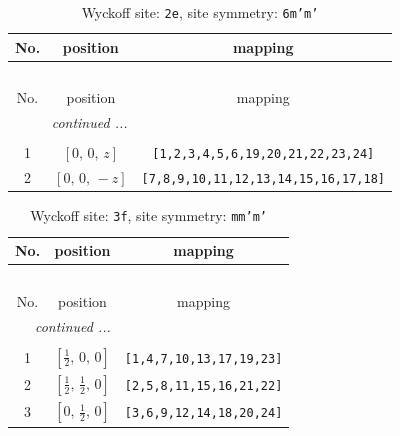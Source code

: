 \documentclass[fleqn,8pt]{jsarticle}
\begin{document}
\begin{longtable}{ccc}
\caption{Wyckoff site: {\tt 2e}, site symmetry: {\tt 6m'm'}}
 \\
 \hline \hline
No. & position & mapping \\ \hline \endfirsthead

\multicolumn{2}{l}{\tablename\ \thetable{}} \\
 \hline \hline
No. & position & mapping \\ \hline \endhead

 \hline \hline
\multicolumn{2}{r}{\footnotesize\it continued ...} \\ \endfoot

 \hline \hline
\multicolumn{2}{r}{} \\ \endlastfoot

1 & $\left[ 0,\, 0,\, z \right]$ & {\tt [1,2,3,4,5,6,19,20,21,22,23,24]} \\ \hline
2 & $\left[ 0,\, 0,\, - z \right]$ & {\tt [7,8,9,10,11,12,13,14,15,16,17,18]} \\
\end{longtable}
\renewcommand{\arraystretch}{1.2}
\begin{longtable}{ccc}
\caption{Wyckoff site: {\tt 3f}, site symmetry: {\tt mm'm'}}
 \\
 \hline \hline
No. & position & mapping \\ \hline \endfirsthead

\multicolumn{2}{l}{\tablename\ \thetable{}} \\
 \hline \hline
No. & position & mapping \\ \hline \endhead

 \hline \hline
\multicolumn{2}{r}{\footnotesize\it continued ...} \\ \endfoot

 \hline \hline
\multicolumn{2}{r}{} \\ \endlastfoot

1 & $\left[ \frac{1}{2},\, 0,\, 0 \right]$ & {\tt [1,4,7,10,13,17,19,23]} \\ \hline
2 & $\left[ \frac{1}{2},\, \frac{1}{2},\, 0 \right]$ & {\tt [2,5,8,11,15,16,21,22]} \\ \hline
3 & $\left[ 0,\, \frac{1}{2},\, 0 \right]$ & {\tt [3,6,9,12,14,18,20,24]} \\
\end{longtable}
\renewcommand{\arraystretch}{1.2}
\end{document}
